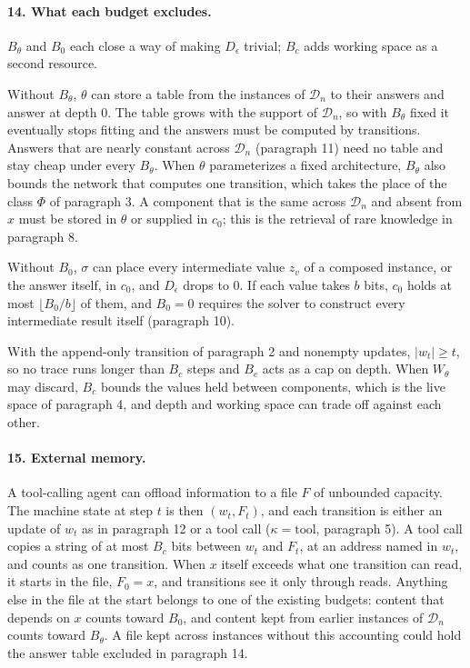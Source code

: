 \documentclass[11pt]{article}
\begin{document}
\paragraph{14. What each budget excludes.}
$B_\theta$ and $B_0$ each close a way of making $D_\epsilon$ trivial;
$B_c$ adds working space as a second resource.

Without $B_\theta$, $\theta$ can store a table from the instances of
$\mathcal D_n$ to their answers and answer at depth $0$. The table grows
with the support of $\mathcal D_n$, so with $B_\theta$ fixed it
eventually stops fitting and the answers must be computed by
transitions. Answers that are nearly constant across $\mathcal D_n$
(paragraph 11) need no table and stay cheap under every $B_\theta$. When
$\theta$ parameterizes a fixed architecture, $B_\theta$ also bounds the
network that computes one transition, which takes the place of the
class $\Phi$ of paragraph 3. A component that is the same across
$\mathcal D_n$ and absent from $x$ must be stored in $\theta$ or supplied
in $c_0$; this is the retrieval of rare knowledge in paragraph 8.

Without $B_0$, $\sigma$ can place every intermediate value $z_v$ of a
composed instance, or the answer itself, in $c_0$, and $D_\epsilon$
drops to $0$. If each value takes $b$ bits, $c_0$ holds at most
$\lfloor B_0/b\rfloor$ of them, and $B_0=0$ requires the solver to
construct every intermediate result itself (paragraph 10).

With the append-only transition of paragraph 2 and nonempty updates,
$|w_t|\geq t$, so no trace runs longer than $B_c$ steps and $B_c$ acts
as a cap on depth. When $W_\theta$ may discard, $B_c$ bounds the values
held between components, which is the live space of paragraph 4, and
depth and working space can trade off against each other.

\paragraph{15. External memory.}
A tool-calling agent can offload information to a file $F$ of unbounded
capacity. The machine state at step $t$ is then $(w_t,F_t)$, and each
transition is either an update of $w_t$ as in paragraph 12 or a tool
call ($\kappa=\text{tool}$, paragraph 5). A tool call copies a string of
at most $B_c$ bits between $w_t$ and $F_t$, at an address named in
$w_t$, and counts as one transition. When $x$ itself exceeds what one
transition can read, it starts in the file, $F_0=x$, and transitions see
it only through reads. Anything else in the file at the start belongs to
one of the existing budgets: content that depends on $x$ counts toward
$B_0$, and content kept from earlier instances of $\mathcal D_n$ counts
toward $B_\theta$. A file kept across instances without this accounting
could hold the answer table excluded in paragraph 14.
\end{document}
